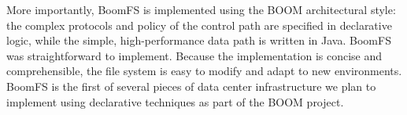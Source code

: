 \documentclass[twocolumn]{article}
\begin{document}
More importantly, BoomFS is implemented using the BOOM architectural
style: the complex protocols and policy of the control path are
specified in declarative logic, while the simple, high-performance
data path is written in Java. BoomFS was straightforward to
implement. Because the implementation is concise and comprehensible,
the file system is easy to modify and adapt to new environments. BoomFS
is the first of several pieces of data center infrastructure we plan
to implement using declarative techniques as part of the BOOM project.



\end{document}
